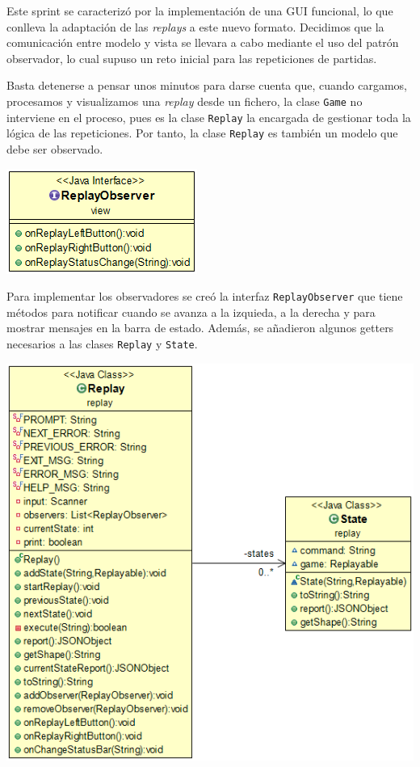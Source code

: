 \documentclass[../DocumentoOficial.tex]{subfiles}
\begin{document}
\begin{sprint}[4]

Este sprint se caracterizó por la implementación de una GUI funcional, lo que conlleva la adaptación de las \textit{replays} a este nuevo formato. Decidimos que la comunicación entre modelo y vista se llevara a cabo mediante el uso del patrón observador, lo cual supuso un reto inicial para las repeticiones de partidas.

Basta detenerse a pensar unos minutos para darse cuenta que, cuando cargamos, procesamos y visualizamos una \textit{replay} desde un fichero, la clase \texttt{Game} no interviene en el proceso, pues es la clase \texttt{Replay} la encargada de gestionar toda la lógica de las repeticiones. Por tanto, la clase \texttt{Replay} es también un modelo que debe ser observado.

\begin{center}
\includegraphics[scale=0.5]{rolit-observer-sprint4.png}
\end{center}

Para implementar los observadores se creó la interfaz \texttt{ReplayObserver} que tiene métodos para notificar cuando se avanza a la izquieda, a la derecha y para mostrar mensajes en la barra de estado. Además, se añadieron algunos getters necesarios a las clases \texttt{Replay} y \texttt{State}.

\begin{center}
\includegraphics[scale=0.5]{replay-state-sprint-4.png}
\end{center}

\end{sprint}
\end{document}
